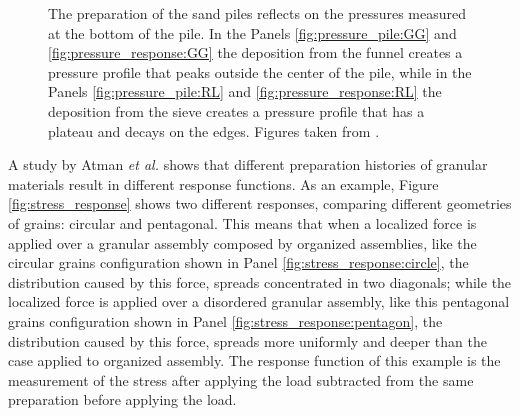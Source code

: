 \begin{figure}
    \caption[Effect of the preparation history using funnel and sieve.]{The preparation of the sand piles reflects on the pressures measured at the bottom of the pile. In the Panels \ref{fig:pressure_pile:GG} and \ref{fig:pressure_response:GG} the deposition from the funnel creates a pressure profile that peaks outside the center of the pile, while in the Panels \ref{fig:pressure_pile:RL} and \ref{fig:pressure_response:RL} the deposition from the sieve creates a pressure profile that has a plateau and decays on the edges. Figures taken from \cite{Memories_in_Sand}.}
    \label{fig:pile_stress}
\end{figure}    


    A study by Atman \textit{et al.} \cite{Sensitivity_of_Stress_Response_Function_to_Packing_Preparation} shows that different preparation histories of granular materials result in different response functions. As an example, Figure \ref{fig:stress_response} shows two different responses, comparing different geometries of grains: circular and pentagonal. This means that when a localized force is applied over a granular assembly composed by organized assemblies, like the circular grains configuration shown in Panel \ref{fig:stress_response:circle}, the distribution caused by this force, spreads concentrated in two diagonals; while the localized force is applied over a disordered granular assembly, like this pentagonal grains configuration shown in Panel \ref{fig:stress_response:pentagon}, the distribution caused by this force, spreads more uniformly and deeper than the case applied to organized assembly. The response function of this example is the measurement of the stress after applying the load subtracted from the same preparation before applying the load.

